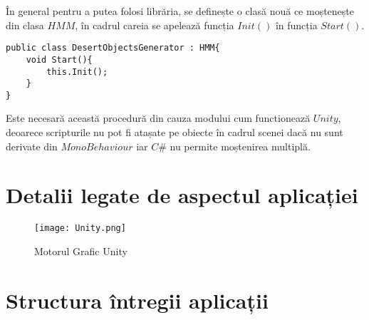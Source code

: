 În general pentru a putea folosi librăria, se definește o clasă nouă ce moștenește din clasa $HMM$, în cadrul careia se apelează funcția $Init()$ în funcția $Start()$.\par

\begin{lstlisting}[caption=Exemplu de folosire a librăriei]
public class DesertObjectsGenerator : HMM{
    void Start(){
        this.Init();
    }
}
\end{lstlisting}

Este necesară această procedură din cauza modului cum functionează $Unity$, deoarece scripturile nu pot fi atașate pe obiecte în cadrul scenei dacă nu sunt derivate din $MonoBehaviour$ iar $C\#$ nu permite moștenirea multiplă.\par

\section{Detalii legate de aspectul aplicației}

\vspace{10mm}
\begin{figure}[H]
\centering
\texttt{[image: Unity.png]} \par
\caption{Motorul Grafic Unity}
\end{figure}

\section{Structura întregii aplicații}